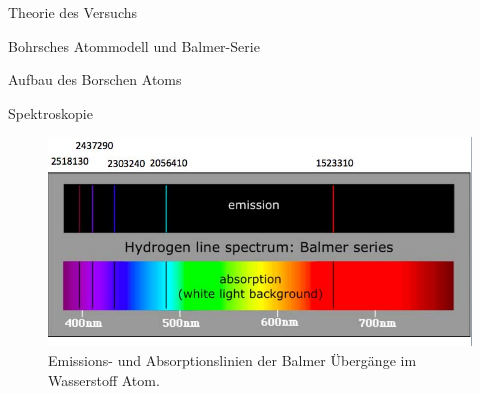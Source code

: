 \documentclass[pdftex, a4paper,11pt, twoside, ngerman]{report}
\begin{document}
\begin{chapter}{Theorie des Versuchs}
\begin{section}{Bohrsches Atommodell und Balmer-Serie}
\begin{subsection}{Aufbau des Borschen Atoms}
	
      \end{subsection}
      
      
      
      \begin{subsection}{Spektroskopie}
	\label{chp:TheorieBohrBalmerSerieSpektroskopie}
	
	
	\begin{figure}[htbp]
	  \begin{center}
	    \includegraphics[width=.8\textwidth]{Figures/BalmerserieEmissionAbsorption.png}
	    \caption{Emissions- und Absorptionslinien der Balmer Übergänge im Wasserstoff Atom.\cite{bib:BalmerserieEmissionAbsorption}}\label{fig:BalmerserieEmissionAbsorption}
	  \end{center}
	\end{figure}
	
      \end{subsection}
      
      
    \end{section}
    
  \end{chapter}
  
\end{document}

